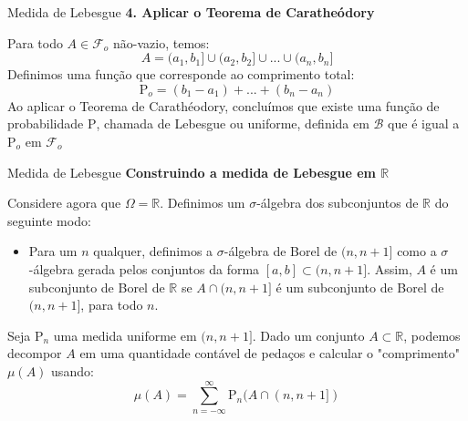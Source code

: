 \documentclass[10pt]{beamer}
\begin{document}
\begin{frame}[fragile]{Medida de Lebesgue}
\textbf{4. Aplicar o Teorema de Caratheódory}

Para todo $A \in \mathcal{F}_o$ não-vazio, temos:
$$A = (a_1,b_1] \cup (a_2,b_2] \cup ... \cup (a_n,b_n]$$
Definimos uma função que corresponde ao comprimento total:
$$\mathrm{P}_o =(b_1 - a_1) + ... + (b_n - a_n)$$
Ao aplicar o Teorema de Carathéodory, concluímos que existe uma função de probabilidade $\mathrm{P}$, chamada de Lebesgue ou uniforme, definida em $\mathcal{B}$ que é igual a $\mathrm{P}_o$ em $\mathcal{F}_o$
\end{frame}

\begin{frame}[fragile]{Medida de Lebesgue}
\textbf{Construindo a medida de Lebesgue em $\mathbb{R}$}

Considere agora que $\Omega = \mathbb{R}$. Definimos um $\sigma$-álgebra dos subconjuntos de $\mathbb{R}$ do seguinte modo:
\begin{itemize}
    \item Para um $n$ qualquer, definimos a $\sigma$-álgebra de Borel de $(n,n+1]$ como
    a $\sigma$-álgebra gerada pelos conjuntos da forma $[a,b] \subset (n,n+1]$. Assim, $A$ é um subconjunto de Borel
    de $\mathbb{R}$ se $A \cap (n,n+1]$ é um subconjunto de Borel de $(n,n+1]$, para todo $n$.
\end{itemize}
Seja $\mathrm{P}_n$ uma medida uniforme em $(n,n+1]$. Dado um conjunto $A \subset \mathbb{R}$, podemos decompor $A$ em uma quantidade contável de pedaços e calcular o "comprimento" $\mu(A)$ usando:
$$\mu(A) = \sum_{n=-\infty}^{\infty} \mathrm{P}_n(A\cap(n,n+1])$$


\end{frame}




%   
  

\end{document}
